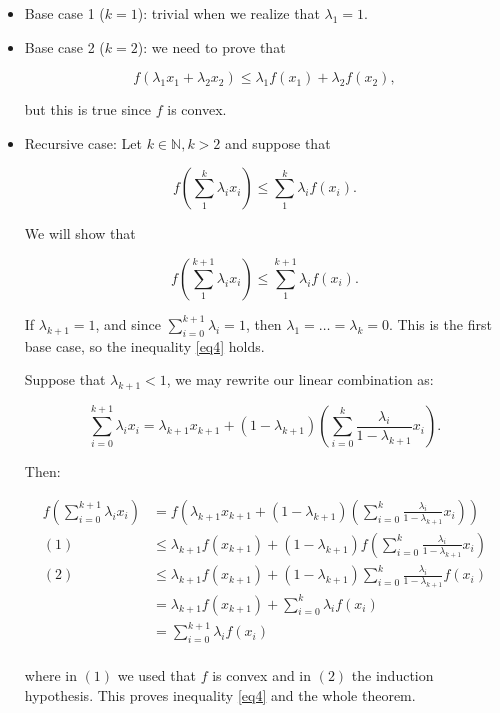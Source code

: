 \documentclass[11pt,table]{article}
\begin{document}
	\begin{itemize}
		\item Base case 1 ($k=1$): trivial when we realize that \(\lambda_1 = 1\).
		\item Base case 2 ($k=2$): we need to prove that
		
		\[
		f(\lambda_1 x_1 + \lambda_2 x_2) \le \lambda_1 f(x_1) + \lambda_2 f(x_2),
		\]
		
		but this is true since $f$ is convex.
		
		\item Recursive case: Let $k \in \mathbb N, k > 2$ and suppose that
		
		\[
		f\left(\sum_{1}^{k} \lambda_{i} x_{i}\right) \leq \sum_{1}^{k} \lambda_{i} f\left(x_{i}\right).
		\]
		
		We will show that
		
		\begin{equation}
			\label{eq4}
			f\left(\sum_{1}^{k+1} \lambda_{i} x_{i}\right) \leq \sum_{1}^{k+1} \lambda_{i} f\left(x_{i}\right).
		\end{equation}
		
		If $\lambda_{k+1} = 1$, and since $\sum_{i=0}^{k+1} \lambda_i = 1$, then $\lambda_1 = \ldots = \lambda_k = 0$. This is the first base case, so the inequality \ref{eq4} holds.
		
		Suppose that $\lambda_{k+1} < 1$, we may rewrite our linear combination as:
		
		\[
		\sum_{i=0}^{k+1} \lambda_i x_i = \lambda_{k+1} x_{k+1} + (1 - \lambda_{k+1}) \left( \sum_{i=0}^k \frac{\lambda_i}{1-\lambda_{k+1}} x_i\right).
		\]
		
		Then:
		
		\begin{align*}
			f\left(\sum_{i=0}^{k+1} \lambda_i x_i\right) & = f\left(\lambda_{k+1} x_{k+1} + (1 - \lambda_{k+1}) \left( \sum_{i=0}^k \frac{\lambda_i}{1-\lambda_{k+1}} x_i\right)\right) \\
			(1) \quad & \le \lambda_{k+1} f(x_{k+1}) + (1 - \lambda_{k+1}) f\left( \sum_{i=0}^k \frac{\lambda_i}{1-\lambda_{k+1}} x_i\right) \\
			(2) \quad & \le \lambda_{k+1} f(x_{k+1}) + (1 - \lambda_{k+1}) \sum_{i=0}^k \frac{\lambda_i}{1-\lambda_{k+1}} f(x_i) \\
			& = \lambda_{k+1} f(x_{k+1}) + \sum_{i=0}^k \lambda_i f(x_i) \\
			& = \sum_{i=0}^{k+1} \lambda_i f(x_i) \\
		\end{align*}
		
		where in $(1)$ we used that $f$ is convex and in $(2)$ the induction hypothesis. This proves inequality \ref{eq4} and the whole theorem. \\
	\end{itemize}
	
\end{document}
